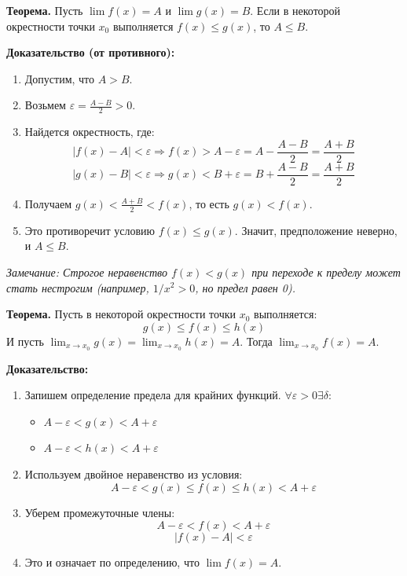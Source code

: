 \begin{tcolorbox}[title=3. Предельный переход в неравенствах]
	\textbf{Теорема.} Пусть $\lim f(x) = A$ и $\lim g(x) = B$.
	Если в некоторой окрестности точки $x_0$ выполняется $f(x) \leq g(x)$, то $A \leq B$.
	
	\textbf{Доказательство (от противного):}
	\begin{enumerate}
		\item Допустим, что $A > B$.
		\item Возьмем $\varepsilon = \frac{A - B}{2} > 0$.
		\item Найдется окрестность, где:
		$$ |f(x) - A| < \varepsilon \Rightarrow f(x) > A - \varepsilon = A - \frac{A-B}{2} = \frac{A+B}{2} $$
		$$ |g(x) - B| < \varepsilon \Rightarrow g(x) < B + \varepsilon = B + \frac{A-B}{2} = \frac{A+B}{2} $$
		\item Получаем $g(x) < \frac{A+B}{2} < f(x)$, то есть $g(x) < f(x)$.
		\item Это противоречит условию $f(x) \leq g(x)$. Значит, предположение неверно, и $A \leq B$.
	\end{enumerate}
	\textit{Замечание: Строгое неравенство $f(x) < g(x)$ при переходе к пределу может стать нестрогим (например, $1/x^2 > 0$, но предел равен 0).}
\end{tcolorbox}

\begin{tcolorbox}[title=4. Теорема о зажатой функции (о двух милиционерах)]
	\textbf{Теорема.} Пусть в некоторой окрестности точки $x_0$ выполняется:
	$$ g(x) \leq f(x) \leq h(x) $$
	И пусть $\lim_{x\to x_0} g(x) = \lim_{x\to x_0} h(x) = A$.
	Тогда $\lim_{x\to x_0} f(x) = A$.
	
	\textbf{Доказательство:}
	\begin{enumerate}
		\item Запишем определение предела для крайних функций. $\forall \varepsilon > 0 \exists \delta$:
		\begin{itemize}
			\item $A - \varepsilon < g(x) < A + \varepsilon$
			\item $A - \varepsilon < h(x) < A + \varepsilon$
		\end{itemize}
		\item Используем двойное неравенство из условия:
		$$ A - \varepsilon < g(x) \leq f(x) \leq h(x) < A + \varepsilon $$
		\item Уберем промежуточные члены:
		$$ A - \varepsilon < f(x) < A + \varepsilon $$
		$$ |f(x) - A| < \varepsilon $$
		\item Это и означает по определению, что $\lim f(x) = A$.
	\end{enumerate}
\end{tcolorbox}

